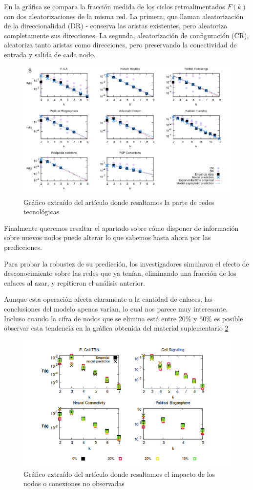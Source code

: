 \documentclass[1p]{elsarticle}
\begin{document}
 En la gráfica se compara la fracción medida de los ciclos retroalimentados $F(k)$ con dos aleatorizaciones de la misma red. La primera, que llaman aleatorización de la direccionalidad (DR) - conserva las aristas existentes, pero aleatoriza completamente sus direcciones. La segunda, aleatorización de configuración (CR), aleatoriza tanto aristas como direcciones, pero preservando la conectividad de entrada y salida de cada nodo.
\begin{figure}
	\centering
	\includegraphics[width=15cm]{graf_2.png}
	\caption{Gráfico extraído del artículo donde resaltamos la parte de redes tecnológicas}
	\label{h1}
\end{figure}

Finalmente queremos resaltar el apartado sobre cómo disponer de información sobre nuevos nodos puede alterar lo que sabemos hasta ahora por las predicciones.

 Para probar la robustez
de su predicción, los investigadores simularon el efecto de desconocimiento sobre las redes que ya tenían,
eliminando una fracción de los enlaces al azar, y repitieron el análisis anterior. 

Aunque esta operación afecta claramente a la cantidad de enlaces, las conclusiones del modelo apenas varían, lo cual nos parece muy interesante. Incluso cuando la cifra de nodos que se elimina está entre $20\%$ y $50\%$ es posible observar esta tendencia en la gráfica obtenida del material suplementario \ref{h4}
\begin{figure}
	\centering
	\includegraphics[width=15cm]{graf_3.png}
	\caption{Gráfico extraído del artículo donde resaltamos el impacto de los nodos o conexiones no observadas}
	\label{h4}
\end{figure}
\end{document}
